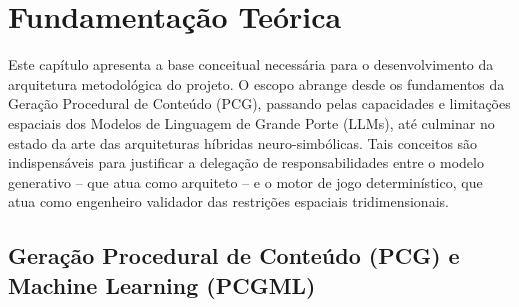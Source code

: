 \section{Fundamentação Teórica}


Este capítulo apresenta a base conceitual necessária para o desenvolvimento da arquitetura metodológica do projeto. O escopo abrange desde os fundamentos da Geração Procedural de Conteúdo (PCG), passando pelas capacidades e limitações espaciais dos Modelos de Linguagem de Grande Porte (LLMs), até culminar no estado da arte das arquiteturas híbridas neuro-simbólicas. Tais conceitos são indispensáveis para justificar a delegação de responsabilidades entre o modelo generativo -- que atua como arquiteto -- e o motor de jogo determinístico, que atua como engenheiro validador das restrições espaciais tridimensionais.

\subsection{Geração Procedural de Conteúdo (PCG) e Machine Learning (PCGML)}

